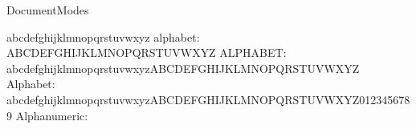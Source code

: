 %
%
\startenvironment DocumentModes



\startmode[correction]
  \setupinterlinespace[big]
  \version[concept]
\stopmode

\startmode[draft]
  \version[temporary]
  \enablemode[quick]
\stopmode

\startmode[quick]
  \setupexternalfigures
    [option=empty]
\stopmode


\startmode[booklet]
  \setuppapersize[A5][A4,landscape]
  \setuparranging[2UP]
\stopmode

\startmode[sideways]
  \setuppapersize[A5][A4,landscape]
  \setuparranging[2SIDE]
\stopmode


\startmode[makeup]
  \showframe               %
  \showsetups              %
  \showfontstrip           %
  \showbodyfont            %
\stopmode

\startmode[alphabet]
  \startlines
  \setbox\scratchbox\hbox{abcdefghijklmnopqrstuvwxyz}
  alphabet: \the\wd\scratchbox
  \setbox\scratchbox\hbox{ABCDEFGHIJKLMNOPQRSTUVWXYZ}
  ALPHABET: \the\wd\scratchbox
  \setbox\scratchbox\hbox{abcdefghijklmnopqrstuvwxyzABCDEFGHIJKLMNOPQRSTUVWXYZ}
  Alphabet: \the\wd\scratchbox
  \setbox\scratchbox\hbox{abcdefghijklmnopqrstuvwxyzABCDEFGHIJKLMNOPQRSTUVWXYZ0123456789}
  Alphanumeric: \the\wd\scratchbox
  \stoplines
\stopmode

\stopenvironment

